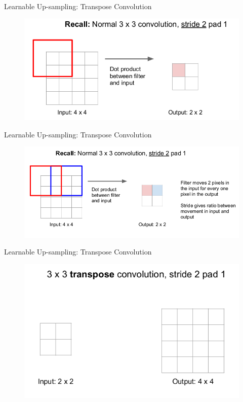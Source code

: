 \documentclass[aspectratio=169]{beamer}
\begin{document}
\begin{frame}{Learnable Up-sampling: Transpose Convolution}
\begin{figure}
    \centering
    \includegraphics[scale=.4]{demo/figs/tconv5.png}
\end{figure}
\end{frame}

\begin{frame}{Learnable Up-sampling: Transpose Convolution}
\begin{figure}
    \centering
    \includegraphics[scale=.4]{demo/figs/tconv6.png}
\end{figure}
\end{frame}

\begin{frame}{Learnable Up-sampling: Transpose Convolution}
\begin{figure}
    \centering
    \includegraphics[scale=.4]{demo/figs/tconv7.png}
\end{figure}
\end{frame}
\end{document}
